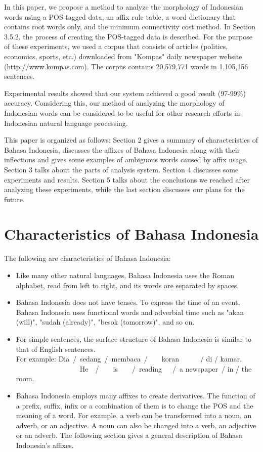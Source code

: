 \documentclass[english]{nlp}
\begin{document}
In this paper, we propose a method to analyze the morphology of
Indonesian words using a POS tagged data, an affix rule table,
a word dictionary that contains root words only, and the minimum connectivity
cost method.
In Section 3.5.2, the process of creating the POS-tagged data is described.
For the purpose of these experiments, we used a corpus that consists of 
articles (politics, economics, sports, etc.) downloaded from "Kompas" 
daily newspaper website (http://www.kompas.com).
The corpus contains 20,579,771 words in 1,105,156 sentences.

Experimental results showed that our system achieved a good 
result (97-99\%) accuracy. Considering this, 
our method of analyzing the morphology of Indonesian words can be
considered to be useful for other research efforts in Indonesian natural language 
processing.

This paper is organized as follows: Section 2 gives a
summary of characteristics of Bahasa Indonesia, discusses the affixes
of Bahasa Indonesia along with their inflections and gives some examples of
ambiguous words caused by affix usage.
Section 3 talks about the parts of analysis system.
Section 4 discusses some experiments and results.
Section 5 talks about the conclusions we reached after analyzing these experiments,
while the last section discusses our plans for the future.
\section{Characteristics of Bahasa Indonesia}
The following are characteristics of Bahasa Indonesia:
\begin{itemize}
\item Like many other natural languages, Bahasa Indonesia 
uses the Roman alphabet, read from left to right, and its words are separated 
by spaces.
\item Bahasa Indonesia does not have tenses. To express the time of 
an event, Bahasa Indonesia uses functional words and adverbial 
time such as "akan (will)", "sudah (already)", "besok (tomorrow)", 
and so on.
\item For simple sentences, the surface structure of Bahasa 
Indonesia is similar to that of English sentences.\\
For example: Dia~/~sedang~/~membaca~/~~~~koran~~~~~~/ di / kamar.\\
~~~~~~~~~~~~~~~~~~He~~/~~~~is~~~~/~reading~~~/~a newspaper~/ in / the room.
\item Bahasa Indonesia employs many affixes to create derivatives. 
The function of a prefix, suffix, infix or a combination of them 
is to change the POS and the meaning of a word.
For example, a verb can be transformed into a noun, an adverb, 
or an adjective. 
A noun can also be changed into a verb, an adjective or an adverb. 
The following section gives a general description of Bahasa Indonesia's affixes.
\end{itemize}
\end{document}
